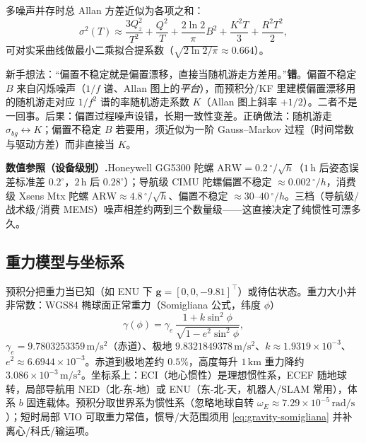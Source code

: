 多噪声并存时总 Allan 方差近似为各项之和：
\begin{equation}
  \sigma^2(T)\approx\frac{3Q_z^2}{T^2}+\frac{Q^2}{T}+\frac{2\ln2}{\pi}B^2+\frac{K^2T}{3}+\frac{R^2T^2}{2},
  \label{eq:allan-combined}
\end{equation}
可对实采曲线做最小二乘拟合提系数（$\sqrt{2\ln2/\pi}\approx0.664$）。

\begin{pitfall}
新手想法：“偏置不稳定就是偏置漂移，直接当随机游走方差用。”\textbf{错}。偏置不稳定 $B$ 来自闪烁噪声（$1/f$ 谱、Allan 图上的\emph{平台}），而预积分/KF 里建模偏置漂移用的随机游走对应 $1/f^2$ 谱的率随机游走系数 $K$（Allan 图上斜率 $+1/2$）。二者不是一回事。后果：偏置过程噪声设错，长期一致性变差。正确做法：随机游走 $\sigma_{bg}\leftrightarrow K$；偏置不稳定 $B$ 若要用，须近似为一阶 Gauss--Markov 过程（时间常数与驱动方差）而非直接当 $K$。
\end{pitfall}

\begin{note}
\textbf{数值参照（设备级别）.}\;Honeywell GG5300 陀螺 $\mathrm{ARW}=0.2\,^\circ/\sqrt h$（$1\,\mathrm h$ 后姿态误差标准差 $0.2^\circ$，$2\,\mathrm h$ 后 $0.28^\circ$）\cite{woodman2007inertial}；导航级 CIMU 陀螺偏置不稳定 $\approx0.002\,^\circ/h$，消费级 Xsens Mtx 陀螺 $\mathrm{ARW}\approx4.8\,^\circ/\sqrt h$、偏置不稳定 $\approx30$--$40\,^\circ/h$。三档（导航级/战术级/消费 MEMS）噪声相差约两到三个数量级——这直接决定了纯惯性可漂多久。
\end{note}

\subsection{重力模型与坐标系}
\label{subsec:gravity}

预积分把重力当已知（如 ENU 下 $\mathbf g=[0,0,-9.81]^\top$）或待估状态。重力大小并非常数：WGS84 椭球面正常重力（Somigliana 公式，纬度 $\phi$）
\begin{equation}
  \gamma(\phi)=\gamma_e\,\frac{1+k\sin^2\phi}{\sqrt{1-e^2\sin^2\phi}},
  \label{eq:gravity-somigliana}
\end{equation}
$\gamma_e=9.7803253359\,\mathrm{m/s^2}$（赤道）、极地 $9.8321849378\,\mathrm{m/s^2}$、$k\approx1.9319\times10^{-3}$、$e^2\approx6.6944\times10^{-3}$。赤道到极地差约 $0.5\%$，高度每升 $1\,\mathrm{km}$ 重力降约 $3.086\times10^{-3}\,\mathrm{m/s^2}$。坐标系上：ECI（地心惯性）是理想惯性系，ECEF 随地球转，局部导航用 NED（北-东-地）或 ENU（东-北-天，机器人/SLAM 常用），体系 $b$ 固连载体。预积分取世界系为惯性系（忽略地球自转 $\omega_E\approx7.29\times10^{-5}\,\mathrm{rad/s}$）；短时局部 VIO 可取重力常值，惯导/大范围须用 \cref{eq:gravity-somigliana} 并补离心/科氏/输运项。

